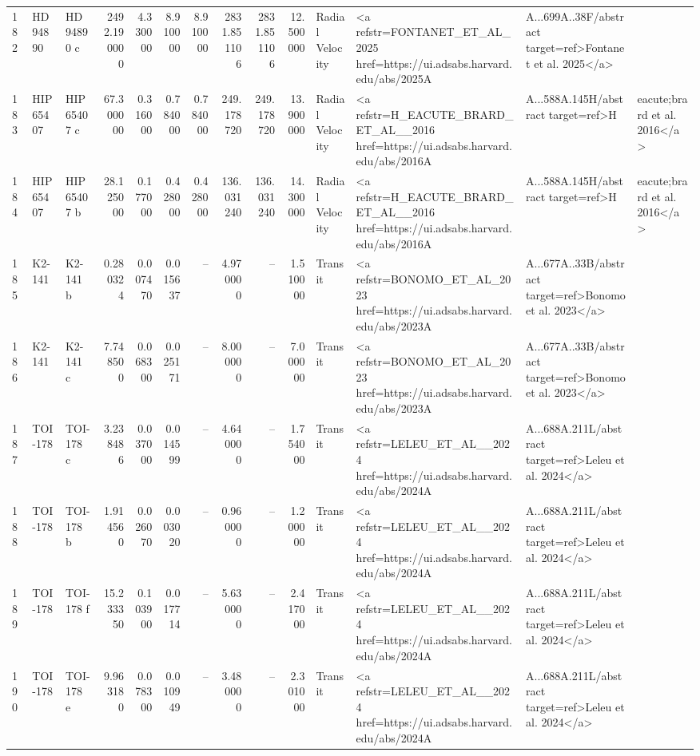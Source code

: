 \begin{tabular}{lllrrrrrrrll}
182 & HD 94890 & HD 94890 c & 2492.190000 & 4.330000 & 8.910000 & 8.910000 & 2831.851106 & 2831.851106 & 12.500000 & Radial Velocity & <a refstr=FONTANET_ET_AL_2025 href=https://ui.adsabs.harvard.edu/abs/2025A&A...699A..38F/abstract target=ref>Fontanet et al. 2025</a> \\
183 & HIP 65407 & HIP 65407 c & 67.300000 & 0.316000 & 0.784000 & 0.784000 & 249.178720 & 249.178720 & 13.900000 & Radial Velocity & <a refstr=H_EACUTE_BRARD_ET_AL__2016 href=https://ui.adsabs.harvard.edu/abs/2016A&A...588A.145H/abstract target=ref>H&eacute;brard et al. 2016</a> \\
184 & HIP 65407 & HIP 65407 b & 28.125000 & 0.177000 & 0.428000 & 0.428000 & 136.031240 & 136.031240 & 14.300000 & Radial Velocity & <a refstr=H_EACUTE_BRARD_ET_AL__2016 href=https://ui.adsabs.harvard.edu/abs/2016A&A...588A.145H/abstract target=ref>H&eacute;brard et al. 2016</a> \\
185 & K2-141 & K2-141 b & 0.280324 & 0.007470 & 0.015637 & -- & 4.970000 & -- & 1.510000 & Transit & <a refstr=BONOMO_ET_AL_2023 href=https://ui.adsabs.harvard.edu/abs/2023A&A...677A..33B/abstract target=ref>Bonomo et al. 2023</a> \\
186 & K2-141 & K2-141 c & 7.748500 & 0.068300 & 0.025171 & -- & 8.000000 & -- & 7.000000 & Transit & <a refstr=BONOMO_ET_AL_2023 href=https://ui.adsabs.harvard.edu/abs/2023A&A...677A..33B/abstract target=ref>Bonomo et al. 2023</a> \\
187 & TOI-178 & TOI-178 c & 3.238486 & 0.037000 & 0.014599 & -- & 4.640000 & -- & 1.754000 & Transit & <a refstr=LELEU_ET_AL__2024 href=https://ui.adsabs.harvard.edu/abs/2024A&A...688A.211L/abstract target=ref>Leleu et al. 2024</a> \\
188 & TOI-178 & TOI-178 b & 1.914560 & 0.026070 & 0.003020 & -- & 0.960000 & -- & 1.200000 & Transit & <a refstr=LELEU_ET_AL__2024 href=https://ui.adsabs.harvard.edu/abs/2024A&A...688A.211L/abstract target=ref>Leleu et al. 2024</a> \\
189 & TOI-178 & TOI-178 f & 15.233350 & 0.103900 & 0.017714 & -- & 5.630000 & -- & 2.417000 & Transit & <a refstr=LELEU_ET_AL__2024 href=https://ui.adsabs.harvard.edu/abs/2024A&A...688A.211L/abstract target=ref>Leleu et al. 2024</a> \\
190 & TOI-178 & TOI-178 e & 9.963180 & 0.078300 & 0.010949 & -- & 3.480000 & -- & 2.301000 & Transit & <a refstr=LELEU_ET_AL__2024 href=https://ui.adsabs.harvard.edu/abs/2024A&A...688A.211L/abstract target=ref>Leleu et al. 2024</a> \\

\end{tabular}
